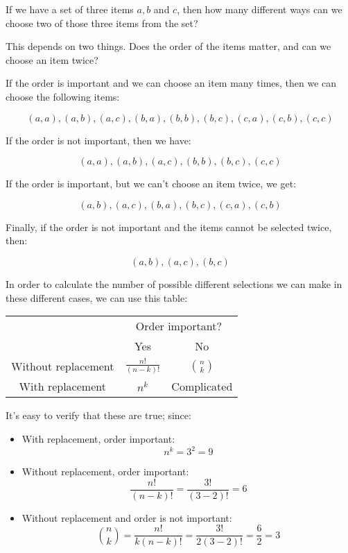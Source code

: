 If we have a set of three items $a, b$ and $c$, then how many different ways can
we choose two of those three items from the set?

This depends on two things. Does the order of the items matter, and can we
choose an item twice?

If the order is important and we can choose an item many times, then we can
choose the following items:

\begin{dmath}
	(a,a), (a,b), (a,c), (b,a), (b,b), (b,c), (c,a), (c,b), (c,c)
\end{dmath}

If the order is not important, then we have:

\begin{dmath}
	(a,a), (a,b), (a,c), (b,b), (b,c), (c,c)
\end{dmath}

If the order is important, but we can't choose an item twice, we get:

\begin{dmath}
	(a,b), (a,c), (b,a), (b,c), (c,a), (c,b)
\end{dmath}

Finally, if the order is not important and the items cannot be selected twice,
then:

\begin{dmath}
	(a,b), (a,c), (b,c)
\end{dmath}

In order to calculate the number of possible different selections we can make in
these different cases, we can use this table:

\begin{center}
\begin{tabular}{|c|c|c|}
	\hline
	& \multicolumn{2}{c|}{Order important?}\\
	\cline{2-3}
	& Yes & No\\ \hline
	Without replacement & $\frac{n!}{(n-k)!}$ & $n \choose k$\\ \hline
	With replacement & $n^k$ & Complicated\\ \hline
\end{tabular}
\end{center}

It's easy to verify that these are true; since:

\begin{itemize}
	\item With replacement, order important:
	\begin{dmath}
		n^k = 3^2 = 9
	\end{dmath}
	\item Without replacement, order important:
	\begin{dmath}
		\frac{n!}{(n - k)!} = 	\frac{3!}{(3 - 2)!} = 6
	\end{dmath}
	\item Without replacement and order is not important:
	\begin{dmath}
		{n \choose k} = \frac{n!}{k(n - k)!} = \frac{3!}{2(3 - 2)!} = \frac{6}{2} = 3
	\end{dmath}

\end{itemize}

